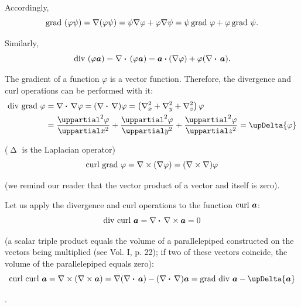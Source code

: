 \noindent
Accordingly,
\begin{equation}\label{eq:1_102}
	\text{grad~}(\varphi\psi) = \nabla(\varphi\psi) = \psi\nabla\varphi + \varphi\nabla\psi = \psi\,\text{grad~}\varphi + \varphi\,\text{grad~}\psi.
\end{equation}

\noindent
Similarly,
\begin{equation}\label{eq:1_103}
	\text{div~}(\varphi\boldsymbol{a}) = \nabla\boldsymbol{\cdot}\,(\varphi\boldsymbol{a}) = \boldsymbol{a}\boldsymbol{\cdot}(\nabla\varphi) + \varphi(\nabla\boldsymbol{\cdot}\,\boldsymbol{a}).
\end{equation}

The gradient of a function $\varphi$ is a vector function. Therefore, the divergence and curl operations can be performed with it:
\begin{align}
	\diverg{\grad{\varphi}} &= \divop{\gradop{\varphi}} = (\divop{\nabla})\varphi = \parenthesis{\nabla_x^2 + \nabla_y^2 + \nabla_z^2}\varphi\nonumber\\
	&= \diffsecpartial{\varphi}{x} + \diffsecpartial{\varphi}{y} + \diffsecpartial{\varphi}{z} = \upDelta{\varphi}\label{eq:1_104}
\end{align}

\noindent
($\upDelta$ is the Laplacian operator)
\begin{equation}\label{eq:1_105}
	\text{curl~}\text{grad~}\varphi = \nabla\times(\nabla\varphi) = (\nabla\times\nabla)\varphi
\end{equation}

\noindent
(we remind our reader that the vector product of a vector and itself is zero).

Let us apply the divergence and curl operations to the function $\text{curl~}\boldsymbol{a}$:
\begin{equation}\label{eq:1_106}
	\text{div~}\text{curl~}\boldsymbol{a} = \nabla\boldsymbol{\cdot}\,\nabla\times\boldsymbol{a} = 0
\end{equation}

\noindent
(a scalar triple product equals the volume of a parallelepiped constructed on the vectors being multiplied (see Vol. I, p. 22); if two of these vectors coincide, the volume of the parallelepiped equals zero):
\begin{equation}\label{eq:1_107}
	\curl{\curl{\vec{a}}} = \curlop{(\curlop{\vec{a}})} = \gradop{(\divop{\vec{a}})} - (\divop{\nabla})\vec{a} = \grad{\diverg{\vec{a}}} - \upDelta{\vec{a}}
\end{equation}

\noindent
[we have used Eq. (1.35) of Vol. I, namely, $\vec{a}\times\vec{b}\times\vec{c} = \vec{b}(\vecdot{a}{c}) - \vec{c}(\vecdot{a}{b})$].

